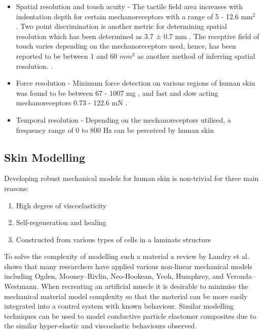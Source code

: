 \begin{itemize}
    \item Spatial resolution and touch acuity - The tactile field area increases with indentation depth for certain mechanoreceptors with a range of 5 - 12.6 mm$^2$ \cite{Deflorio2022}. Two point discrimination is another metric for determining spatial resolution which has been determined as 3.7 ± 0.7 mm \cite{Yokota2020}. The receptive field of touch varies depending on the mechanoreceptors used, hence, has been reported to be between 1 and 60 $mm^2$ as another method of inferring spatial resolution. \cite{Roudaut2012}.
    \item Force resolution - Minimum force detection on various regions of human skin was found to be between 67 - 1007 mg \cite{Ackerley2014}, and fast and slow acting  mechanoreceptors 0.73 - 122.6 mN \cite{Strzalkowski2015}.
    \item Temporal resolution - Depending on the mechanoreceptors utilised, a frequency range of 0 to 800 Hz can be perceived by human skin \cite{Deflorio2022}
\end{itemize}


\subsection{Skin Modelling}
Developing robust mechanical models for human skin is non-trivial for three main reasons:
\begin{enumerate}
    \item High degree of viscoelasticity
    \item Self-regeneration and healing
    \item Constructed from various types of cells in a laminate structure 
\end{enumerate}
To solve the complexity of modelling such a material a review by Landry et al. \cite{Landry2021} shows that many researchers have applied various non-linear mechanical models including Ogden, Mooney–Rivlin, Neo-Hookean, Yeoh, Humphrey, and Veronda–Westmann. When recreating an artificial muscle it is desirable to minimise the mechanical material model complexity so that the material can be more easily integrated into a control system with known behaviour. Similar modelling techniques can be used to model conductive particle elastomer composites due to the similar hyper-elastic and viscoelastic behaviours observed.



